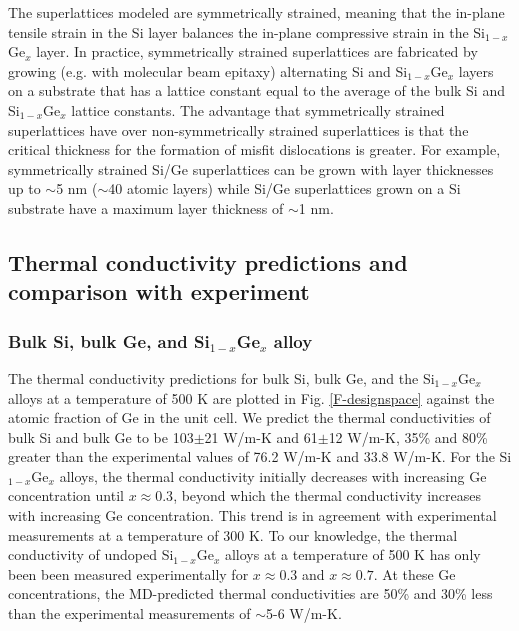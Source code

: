 \documentclass[letterpaper,12pt]{article}
\begin{document}
The superlattices modeled are symmetrically strained, meaning that
the in-plane tensile strain in the Si layer balances the in-plane
compressive strain in the Si$_{1-x}$Ge$_x$ layer. In practice,
symmetrically strained superlattices are fabricated by growing (e.g.
with molecular beam epitaxy\cite{huxtablethesis,borca-tasciuc2000})
alternating Si and Si$_{1-x}$Ge$_x$ layers on a substrate that has a
lattice constant equal to the average of the bulk Si and
Si$_{1-x}$Ge$_x$ lattice constants. The advantage that symmetrically
strained superlattices have over non-symmetrically strained
superlattices is that the critical thickness for the formation of
misfit dislocations is greater.\cite{pearsall1999} For example,
symmetrically strained Si/Ge superlattices can be grown with layer
thicknesses up to $\sim$5 nm ($\sim$40 atomic layers) while Si/Ge
superlattices grown on a Si substrate have a maximum layer thickness
of $\sim$1 nm.\cite{pearsall1999}

\subsection{\label{S-validation-k}Thermal conductivity predictions and comparison with experiment}

\subsubsection*{Bulk Si, bulk Ge, and Si$_{1-x}$Ge$_{x}$ alloy}


The thermal conductivity predictions for bulk Si, bulk Ge, and the
Si$_{1-x}$Ge$_{x}$ alloys at a temperature of 500 K are plotted in
Fig$.$ \ref{F-designspace} against the atomic fraction of Ge in the
unit cell. We predict the thermal conductivities of bulk Si and bulk
Ge to be 103$\pm$21 W/m-K and 61$\pm$12 W/m-K, 35\% and 80\% greater
than the experimental values of 76.2 W/m-K and 33.8
W/m-K.\cite{CRChandbook} For the Si$_{1-x}$Ge$_{x}$ alloys, the
thermal conductivity initially decreases with increasing Ge
concentration until $x \approx 0.3$, beyond which the thermal
conductivity increases with increasing Ge concentration. This trend
is in agreement with experimental measurements at a temperature of
300 K.\cite{maycock1967} To our knowledge, the thermal conductivity
of undoped Si$_{1-x}$Ge$_{x}$ alloys at a temperature of 500 K has
only been been measured experimentally for $x \approx 0.3$ and $x
\approx 0.7$.\cite{abeles1963} At these Ge concentrations, the
MD-predicted thermal conductivities are 50\% and 30\% less than the
experimental measurements of $\sim$5-6 W/m-K.\cite{abeles1963}
\end{document}
